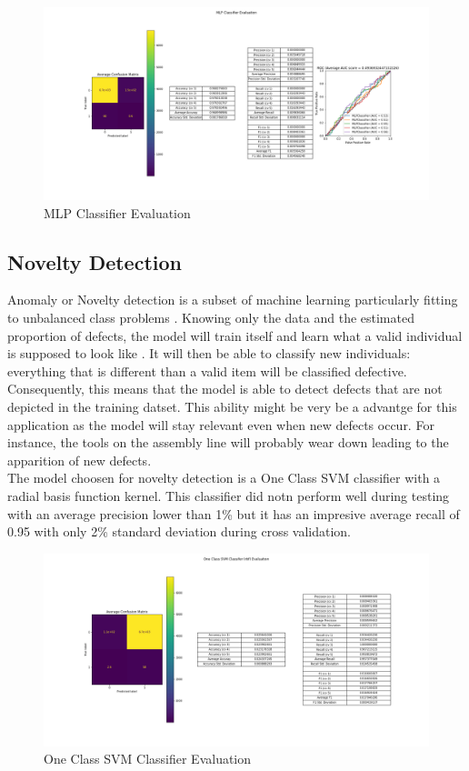 \begin{figure}
    \centering
    \includegraphics[scale=0.32]{img/mlp_d.png}
    \caption{MLP Classifier Evaluation}
    \label{mlp_d}
\end{figure}

\subsection{Novelty Detection}
Anomaly or Novelty detection is a subset of machine learning particularly
fitting to unbalanced class problems \cite{novel_scikit}. Knowing only the data
and the estimated proportion of defects, the model will train itself and learn
what a valid individual is supposed to look like \cite{novel_yt}. It will then
be able to classify new individuals: everything that is different than a valid
item will be classified defective. Consequently, this means that the model is
able to detect defects that are not depicted in the training datset. This
ability might be very be a advantge for this application as the model will stay
relevant even when new defects occur. For instance, the tools on the assembly
line will probably wear down leading to the apparition of new defects.\\

The model choosen for novelty detection is a One Class SVM classifier \cite{osvm_scikit} with a radial basis function kernel. This classifier did notn perform well during testing with an average precision lower than 1\% but it has an impresive average recall of 0.95 with only 2\% standard deviation during cross validation.\\

\begin{figure}
    \centering
    \includegraphics[scale=0.32]{img/osvm_rbf_d.png}
    \caption{One Class SVM Classifier Evaluation}
    \label{osvm_d}
\end{figure}